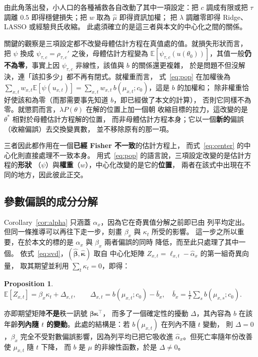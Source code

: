 \documentclass[UTF8, fontset=macnew, a4paper, 12pt]{ctexart}
\newtheorem{prop}{Proposition}
\newcommand{\Ex}{\mathbb{E}}
\begin{document}
由此角落出發，小人口的各種補救各自改動了其中一項設定：把 $c$ 調成有限或把
$\tau$ 調離 $0.5$ 即得穩健損失；把 $w$ 取為 $\hat\mu$ 即得資訊加權；
把 $\lambda$ 調離零即得 Ridge、LASSO 或經驗貝氏收縮。
此處須確立的是這三者與本文的中心化之間的關係。

關鍵的觀察是三項設定都不改變母體估計方程在真值處的值。就損失形狀而言，
把 $\psi$ 換成 $\psi_{\tau,c}=\rho_{\tau,c}'$ 之後，母體估計方程變為
$\Ex[\psi_{\tau,c}(u(\theta_0))]$，其值一般\textbf{仍不為零}，事實上因 $\psi_{\tau,c}$ 非線性，該值與 $b$ 的關係還更複雜，
於是問題不但沒解決，連「該扣多少」都不再有閉式。就權重而言，
式~\eqref{eq:pop} 在加權後為 $\sum_{x,t}w_{x,t}\Ex[\psi(u_{x,t})]=
\sum_{x,t}w_{x,t}\,b(\mu_{x,t};c_0)$，這是 $b$ 的加權和；
除非權重恰好使該和為零（而那需要事先知道 $b$，即已經做了本文的計算），
否則它同樣不為零。就懲罰而言，$\lambda P(\theta)$ 在解的位置上加一個朝
收縮目標的拉力，這改變的是 $\theta^{\ast}$ 相對於母體估計方程解的位置，
而非母體估計方程本身；它以一個\textbf{新的}偏誤（收縮偏誤）去交換變異數，
並不移除原有的那一項。

三者因此都作用在一個\textbf{已經 Fisher 不一致}的估計方程上，
而式~\eqref{eq:center} 的中心化則直接處理不一致本身。
用式~\eqref{eq:pop} 的語言說，三項設定改變的是估計方程的\textbf{形狀}
（$\psi$）與\textbf{權重}（$w$），中心化改變的是它的\textbf{位置}，
兩者在該式中出現在不同的地方，因此彼此正交。

\subsection{參數偏誤的成分分解}\label{sec:betadec}

Corollary~\ref{cor:alpha} 只涵蓋 $\alpha_x$，因為它在奇異值分解之前即已由
列平均定出。但同一條推導可以再往下走一步，刻畫 $\beta_x$ 與 $\kappa_t$ 所受的影響。
這一步之所以重要，在於本文的標的是 $\alpha_x$ 與 $\beta_x$ 兩者偏誤的同時
降低，而至此只處理了其中一個。
依式~\eqref{eq:svd}，$(\hat{\boldsymbol\beta},\hat{\boldsymbol\kappa})$ 取自
中心化矩陣 $Z_{x,t}=\ell_{x,t}-\hat\alpha_x$ 的第一組奇異向量，
取其期望並利用 $\sum_t\kappa_t=0$，即得：

\begin{prop}\label{prop:beta}
$\displaystyle \Ex[Z_{x,t}]=\beta_x\kappa_t+\Delta_{x,t},\qquad
\Delta_{x,t}=b(\mu_{x,t};c_0)-\bar b_x,\quad
\bar b_x=\frac1T\sum_s b(\mu_{x,s};c_0).$
\end{prop}

亦即期望矩陣\textbf{不是}秩一訊號 $\boldsymbol\beta\boldsymbol\kappa^{\top}$，
而多了一個確定性的擾動 $\Delta$，其內容為 $b$ 在該年齡\textbf{列內隨 $t$
的變動}。此處的結構是：若 $b(\mu_{x,t})$ 在列內不隨 $t$ 變動，
則 $\Delta=0$，$\beta_x$ 完全不受對數偏誤影響，因為列平均已把它吸收進
$\hat\alpha_x$。但死亡率隨年份改善使 $\mu_{x,t}$ 隨 $t$ 下降，
而 $b$ 是 $\mu$ 的非線性函數，於是 $\Delta\ne0$。
\end{document}
